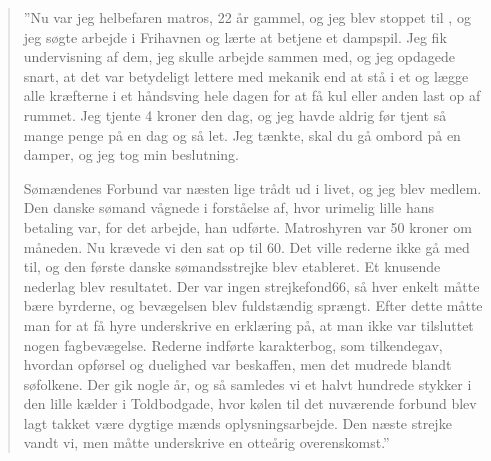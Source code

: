 \begin{quote}
    ''Nu var jeg helbefaren matros, 22 år gammel, og jeg blev stoppet til
    , og jeg søgte arbejde i Frihavnen og lærte at betjene et
    dampspil. Jeg fik undervisning af dem, jeg skulle arbejde sammen med,
    og jeg opdagede snart, at det var betydeligt lettere med mekanik end
    at stå i et  og lægge alle kræfterne i et håndsving hele
    dagen for at få kul eller anden last op af rummet. Jeg tjente 4
    kroner den dag, og jeg havde aldrig før tjent så mange penge på en
    dag og så let. Jeg tænkte, skal du gå ombord på en damper, og jeg tog
    min beslutning.

    Sømændenes Forbund var næsten lige trådt ud i livet, og jeg blev
    medlem.  Den danske sømand vågnede i forståelse af, hvor urimelig
    lille hans betaling var, for det arbejde, han udførte. Matroshyren
    var 50 kroner om måneden. Nu krævede vi den sat op til 60. Det ville
    rederne ikke gå med til, og den første danske sømandsstrejke blev
    etableret. Et knusende nederlag blev resultatet. Der var ingen
    strejkefond66, så hver enkelt måtte bære byrderne, og bevægelsen blev
    fuldstændig sprængt.  Efter dette måtte man for at få hyre
    underskrive en erklæring på, at man ikke var tilsluttet nogen
    fagbevægelse. Rederne indførte karakterbog, som tilkendegav, hvordan
    opførsel og duelighed var beskaffen, men det mudrede blandt
    søfolkene. Der gik nogle år, og så samledes vi et halvt hundrede
    stykker i den lille kælder i Toldbodgade, hvor kølen til det
    nuværende forbund blev lagt takket være dygtige mænds
    oplysningsarbejde.  Den næste strejke vandt vi, men måtte underskrive
    en otteårig overenskomst.''
\end{quote}

